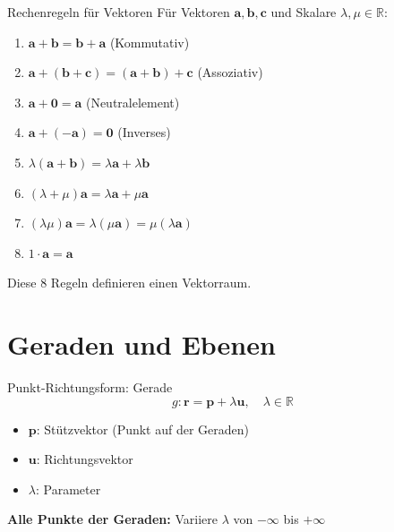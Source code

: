 \documentclass[a4paper, fontsize=7pt]{scrartcl}
\def\R{\mathbb{R}}
\begin{document}
\begin{subbox}{Rechenregeln für Vektoren}
Für Vektoren $\mathbf{a}, \mathbf{b}, \mathbf{c}$ und Skalare $\lambda, \mu \in \R$:

\begin{enumerate}
    \item $\mathbf{a} + \mathbf{b} = \mathbf{b} + \mathbf{a}$ (Kommutativ)
    \item $\mathbf{a} + (\mathbf{b} + \mathbf{c}) = (\mathbf{a} + \mathbf{b}) + \mathbf{c}$ (Assoziativ)
    \item $\mathbf{a} + \mathbf{0} = \mathbf{a}$ (Neutralelement)
    \item $\mathbf{a} + (-\mathbf{a}) = \mathbf{0}$ (Inverses)
    \item $\lambda(\mathbf{a} + \mathbf{b}) = \lambda\mathbf{a} + \lambda\mathbf{b}$
    \item $(\lambda + \mu)\mathbf{a} = \lambda\mathbf{a} + \mu\mathbf{a}$
    \item $(\lambda\mu)\mathbf{a} = \lambda(\mu\mathbf{a}) = \mu(\lambda\mathbf{a})$
    \item $1 \cdot \mathbf{a} = \mathbf{a}$
\end{enumerate}

Diese 8 Regeln definieren einen Vektorraum.
\end{subbox}

\section{Geraden und Ebenen}

\begin{mainbox}{Punkt-Richtungsform: Gerade}
$$g: \mathbf{r} = \mathbf{p} + \lambda \mathbf{u}, \quad \lambda \in \R$$

\begin{itemize}
    \item $\mathbf{p}$: Stützvektor (Punkt auf der Geraden)
    \item $\mathbf{u}$: Richtungsvektor
    \item $\lambda$: Parameter
\end{itemize}

\textbf{Alle Punkte der Geraden:} Variiere $\lambda$ von $-\infty$ bis $+\infty$
\end{mainbox}
\end{document}
